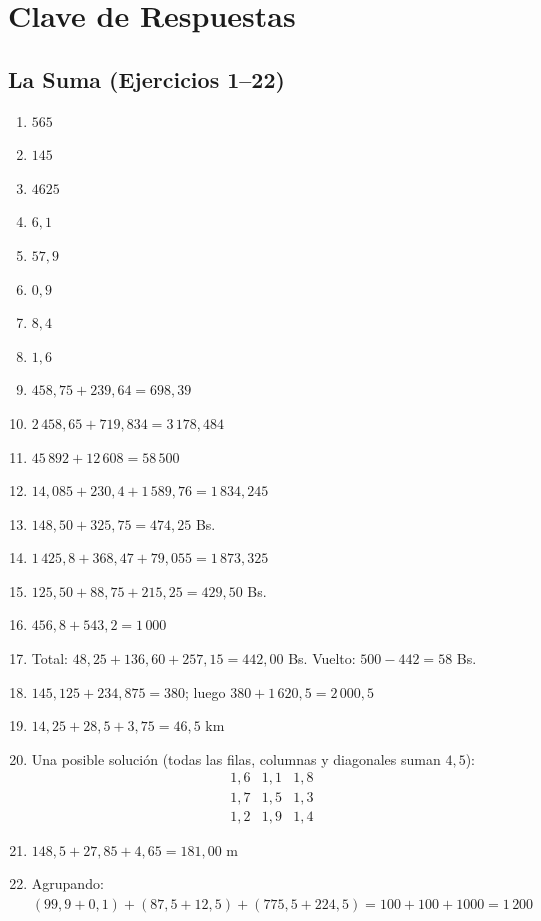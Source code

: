 \documentclass[12pt, letterpaper]{article}
\begin{document}
\newpage

\ifmwclaves
  \section{Clave de Respuestas}

  \subsection*{La Suma (Ejercicios 1--22)}

  \begin{enumerate}[leftmargin=*, label=\textbf{\arabic*.}]
    \item $565$
    \item $145$
    \item $4625$
    \item $6{,}1$
    \item $57{,}9$
    \item $0{,}9$
    \item $8{,}4$
    \item $1{,}6$
    \item $458{,}75 + 239{,}64 = 698{,}39$
    \item $2\,458{,}65 + 719{,}834 = 3\,178{,}484$
    \item $45\,892 + 12\,608 = 58\,500$
    \item $14{,}085 + 230{,}4 + 1\,589{,}76 = 1\,834{,}245$
    \item $148{,}50 + 325{,}75 = 474{,}25$ Bs.
    \item $1\,425{,}8 + 368{,}47 + 79{,}055 = 1\,873{,}325$
    \item $125{,}50 + 88{,}75 + 215{,}25 = 429{,}50$ Bs.
    \item $456{,}8 + 543{,}2 = 1\,000$
    \item Total: $48{,}25 + 136{,}60 + 257{,}15 = 442{,}00$ Bs. Vuelto: $500 - 442 = 58$ Bs.
    \item $145{,}125 + 234{,}875 = 380$; luego $380 + 1\,620{,}5 = 2\,000{,}5$
    \item $14{,}25 + 28{,}5 + 3{,}75 = 46{,}5$ km
    \item Una posible solución (todas las filas, columnas y diagonales suman $4{,}5$):
          \[
            \begin{array}{ccc}
              1{,}6 & 1{,}1 & 1{,}8 \\
              1{,}7 & 1{,}5 & 1{,}3 \\
              1{,}2 & 1{,}9 & 1{,}4
            \end{array}
          \]
    \item $148{,}5 + 27{,}85 + 4{,}65 = 181{,}00$ m
    \item Agrupando: $(99{,}9 + 0{,}1) + (87{,}5 + 12{,}5) + (775{,}5 + 224{,}5) = 100 + 100 + 1000 = 1\,200$
  \end{enumerate}
\end{document}
